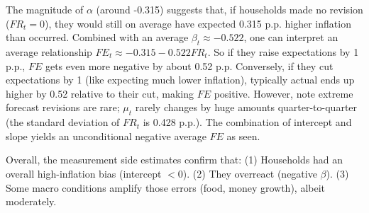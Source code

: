\documentclass[12pt]{article}
\begin{document}
The magnitude of $\alpha$ (around -0.315) suggests that, if households made no revision ($FR_t=0$), they would still on average have expected 0.315 p.p. higher inflation than occurred. Combined with an average $\beta_t\approx -0.522$, one can interpret an average relationship $FE_t \approx -0.315 -0.522 FR_t$. So if they raise expectations by 1 p.p., $FE$ gets even more negative by about 0.52 p.p. Conversely, if they cut expectations by 1 (like expecting much lower inflation), typically actual ends up higher by 0.52 relative to their cut, making $FE$ positive. However, note extreme forecast revisions are rare; $\mu_t$ rarely changes by huge amounts quarter-to-quarter (the standard deviation of $FR_t$ is 0.428 p.p.). The combination of intercept and slope yields an unconditional negative average $FE$ as seen.

Overall, the measurement side estimates confirm that:
(1) Households had an overall high-inflation bias (intercept $<0$).
(2) They overreact (negative $\beta$).
(3) Some macro conditions amplify those errors (food, money growth), albeit moderately.
\end{document}

